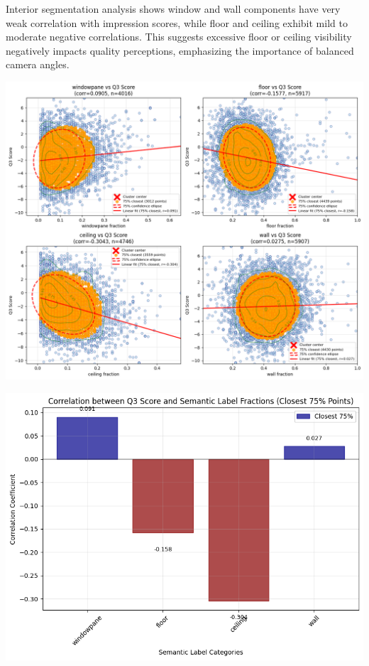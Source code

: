 \documentclass[11pt,a4paper]{article}
\begin{document}
\begin{multicols}{2}
Interior segmentation analysis shows window and wall components have very weak correlation with impression scores, 
while floor and ceiling exhibit mild to moderate negative correlations. This suggests excessive floor or ceiling 
visibility negatively impacts quality perceptions, emphasizing the importance of balanced camera angles.

\begin{flushleft}
    \includegraphics[width=0.9\columnwidth]{plots/inter_q3_cluster.png}
    \label{fig:inter_q3_cluster}
\end{flushleft}

\begin{flushleft}
    \includegraphics[width=0.9\columnwidth]{plots/corr_inter_q3.png}
    \label{fig:corr_inter_q3}
\end{flushleft}


\end{multicols}
\end{document}
